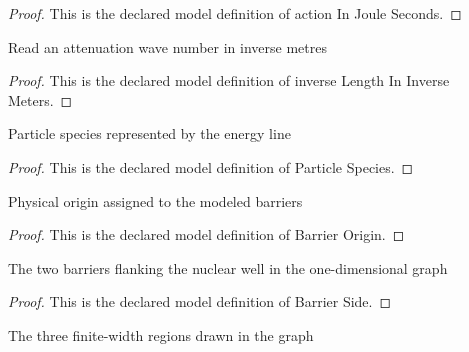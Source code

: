 \begin{proof}
  This is the declared model definition of action In Joule Seconds.
\end{proof}
\begin{definition}
  \label{def:physics:phyx-mini-0660:phyxminiproblems-problemphyxmini0660-inverselengthininversemeters}
  Read an attenuation wave number in inverse metres
\end{definition}
\begin{proof}
  This is the declared model definition of inverse Length In Inverse Meters.
\end{proof}
\begin{definition}
  \label{def:physics:phyx-mini-0660:phyxminiproblems-problemphyxmini0660-particlespecies}
  Particle species represented by the energy line
\end{definition}
\begin{proof}
  This is the declared model definition of Particle Species.
\end{proof}
\begin{definition}
  \label{def:physics:phyx-mini-0660:phyxminiproblems-problemphyxmini0660-barrierorigin}
  Physical origin assigned to the modeled barriers
\end{definition}
\begin{proof}
  This is the declared model definition of Barrier Origin.
\end{proof}
\begin{definition}
  \label{def:physics:phyx-mini-0660:phyxminiproblems-problemphyxmini0660-barrierside}
  The two barriers flanking the nuclear well in the one-dimensional graph
\end{definition}
\begin{proof}
  This is the declared model definition of Barrier Side.
\end{proof}
\begin{definition}
  \label{def:physics:phyx-mini-0660:phyxminiproblems-problemphyxmini0660-potentialregion}
  The three finite-width regions drawn in the graph
\end{definition}
